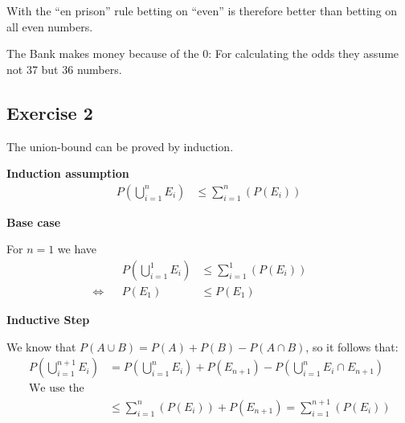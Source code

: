 With the ``en prison'' rule betting on ``even'' is therefore better than betting on all even numbers.

{ }

The Bank makes money because of the $0$: For calculating the odds they assume not 37 but 36 numbers.


\subsection*{Exercise 2}
\setcounter{equation}{0}
The union-bound can be proved by induction.

\textbf{Induction assumption}
\begin{align}
& & P\left(\bigcup\limits_{i=1}^{n}E_i\right) & \leq \sum\limits_{i=1}^{n}(P(E_i)) & &
\end{align}

\textbf{Base case}

For $n=1$ we have
\begin{align}
& & P\left(\bigcup\limits_{i=1}^{1}E_i\right) & \leq \sum\limits_{i=1}^{1}(P(E_i)) & & \\
\Leftrightarrow & & P(E_1) & \leq P(E_1) & & 
\end{align}

\textbf{Inductive Step}

We know that $P(A \cup B) = P(A) + P(B) - P(A \cap B)$, so it follows that:
\begin{align}
& & P\left(\bigcup\limits_{i=1}^{n+1}E_i\right) & = P\left(\bigcup\limits_{i=1}^{n}E_i\right) + P(E_{n+1}) - P\left(\bigcup\limits_{i=1}^{n}E_i \cap E_{n+1}\right) & & \\
& & \mbox{We use the induction assumption:} & & & \\
& & & \leq \sum\limits_{i=1}^{n}(P(E_i)) + P(E_{n+1}) = \sum\limits_{i=1}^{n+1}(P(E_i)) & & 
\end{align}

%

